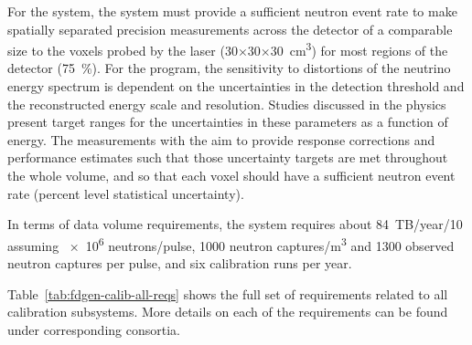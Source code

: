 For the  system, the system must provide a sufficient neutron event rate to make spatially separated precision measurements across the detector of a comparable size to the voxels probed by the laser (\num{30}$\times$\num{30}$\times$\SI{30}{\cubic\cm}) for most regions of the detector (\SI{75}{\%}). 
For the  program, the sensitivity to distortions of the neutrino energy spectrum is dependent on the uncertainties in the detection threshold and the reconstructed energy scale and resolution. Studies discussed in the physics  present target ranges for the uncertainties in these parameters as a function of energy. The measurements with the  aim to provide response corrections and performance estimates such that those uncertainty targets are met throughout the whole volume, and so that each voxel should have a sufficient neutron event rate (percent level statistical uncertainty).



In terms of data volume requirements, the  system requires about \num{84}~TB/year/\SI{10}{\kt} assuming \num{e6} neutrons/pulse, \num{1000} neutron captures/\si{\cubic\m}
and \num{1300} observed neutron captures per pulse, and six calibration runs per year. 



Table~\ref{tab:fdgen-calib-all-reqs} shows the full set of requirements related to all calibration subsystems. More details on each of the requirements can be found under corresponding consortia.   



%



